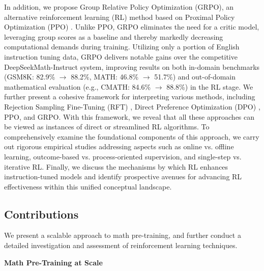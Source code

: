 In addition, we propose Group Relative Policy Optimization (GRPO), an alternative reinforcement learning (RL) method based on Proximal Policy Optimization (PPO) \citep{schulman2017proximal}. Unlike PPO, GRPO eliminates the need for a critic model, leveraging group scores as a baseline and thereby markedly decreasing computational demands during training. Utilizing only a portion of English instruction tuning data, GRPO delivers notable gains over the competitive DeepSeekMath-Instruct system, improving results on both in-domain benchmarks (GSM8K: 82.9\% $\rightarrow$ 88.2\%, MATH: 46.8\% $\rightarrow$ 51.7\%) and out-of-domain mathematical evaluation (e.g., CMATH: 84.6\% $\rightarrow$ 88.8\%) in the RL stage. We further present a cohesive framework for interpreting various methods, including Rejection Sampling Fine-Tuning (RFT) \citep{yuan2023scaling}, Direct Preference Optimization (DPO) \citep{dpo}, PPO, and GRPO. With this framework, we reveal that all these approaches can be viewed as instances of direct or streamlined RL algorithms. To comprehensively examine the foundational components of this approach, we carry out rigorous empirical studies addressing aspects such as online vs. offline learning, outcome-based vs. process-oriented supervision, and single-step vs. iterative RL. Finally, we discuss the mechanisms by which RL enhances instruction-tuned models and identify prospective avenues for advancing RL effectiveness within this unified conceptual landscape.

\subsection{Contributions}
We present a scalable approach to math pre-training, and further conduct a detailed investigation and assessment of reinforcement learning techniques.

\textbf{Math Pre-Training at Scale}

